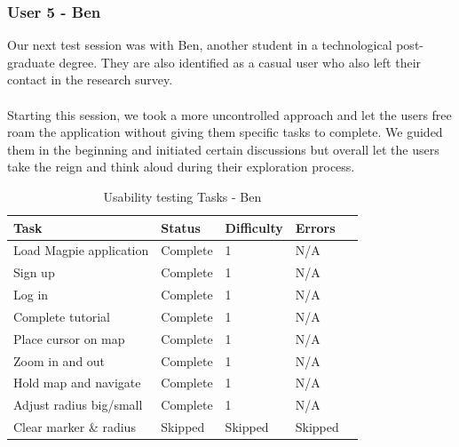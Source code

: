 \subsubsection{User 5 - Ben}
Our next test session was with Ben, another student in a technological post-graduate degree. They are also identified as a casual user who also left their contact in the research survey.\\ \\
Starting this session, we took a more uncontrolled approach and let the users free roam the application without giving them specific tasks to complete. We guided them in the beginning and initiated certain discussions but overall let the users take the reign and think aloud during their exploration process.\\
\begin{table}[h!]
    \centering
    \caption{Usability testing Tasks - Ben}
    \begin{tabular}{|p{}|p{}|p{}|p{}|p{}|}
        \hline
        \textbf{Task}                 & \textbf{Status} & \textbf{Difficulty} & \textbf{Errors} \\
        \hline
        Load Magpie application       & Complete        & 1                   & N/A             \\
        \hline
        Sign up                       & Complete        & 1                   & N/A             \\
        \hline
        Log in                        & Complete        & 1                   & N/A             \\
        \hline
        Complete tutorial             & Complete        & 1                   & N/A             \\
        \hline
        Place cursor on map           & Complete        & 1                   & N/A             \\
        \hline
        Zoom in and out               & Complete        & 1                   & N/A             \\
        \hline
        Hold map and navigate         & Complete        & 1                   & N/A             \\
        \hline
        Adjust radius big/small       & Complete        & 1                   & N/A             \\
        \hline
        Clear marker \& radius        & Skipped         & Skipped             & Skipped         \\

\end{tabular}
\end{table}
